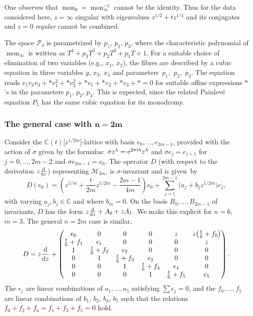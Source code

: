 \documentclass[10pt,a4paper]{amsart}
\numberwithin{equation}{section}
\begin{document}
 One observes that $\operatorname{mon}_0=\operatorname{mon}_\infty^{-1}$ cannot be the identity. Thus for the data considered here, $z=\infty$ singular with
 eigenvalues $z^{1/2}+tz^{1/4}$ and its conjugates and $z=0$ {\it regular} cannot be combined.



 The space $\mathcal{P}_4$ is parametrized by $p_1$, $p_2$, $p_3$, where the characteristic polynomial of $\operatorname{mon}_\infty$ is written as $T^4+p_3T^3+p_2T^2+p_1T+1$. For a suitable choice of
 elimination of two variables (e.g., $x_1$, $x_2$), the fibres are described by a cubic equation in three variables $y$, $x_3$, $x_4$ and parameters~$p_1$,~$p_2$,~$p_3$. The equation reads
 $v_1v_2v_3+*v_1^2+*v_2^2+*v_1+*v_2+*v_3+*=0$ for suitable affine expressions $*$'s in the parameters
 $p_1$, $p_2$, $p_3$. This is expected, since the related Painlev\'e equation $P_5$ has the same cubic equation for its monodromy.

 \subsubsection[The general case with n=2m]{The general case with $\boldsymbol{n=2m}$}

 Consider the $\mathbb{C}(t)\bigl[z^{1/2m}\bigr]$-lattice with basis $e_0,\dots ,e_{2m-1}$, provided with
 the action of $\sigma$ given by the formulas: $\sigma z^\lambda ={\rm e}^{2\pi {\rm i} \lambda}z^\lambda$ and
 $\sigma e_j=e_{j+1}$ for $j=0,\dots ,2m-2$ and $\sigma e_{2m-1}=e_0$. The operator $D$
 (with respect to the derivation $z\frac{{\rm d}}{{\rm d}z}$) representing $\mathcal{M}_{2m}$, is $\sigma$-invariant
 and is given~by
 \[D(e_0)=\left(z^{1/m}+\frac{t}{2m}z^{1/2m}-\frac{2m-1}{4m}\right)e_0 +\sum_{j=1}^{2m-1}\bigl(a_j+b_jz^{1/2m}\bigr)e_j,\]
with varying $a_j,b_j\in \mathbb{C}$ and where $b_m=0$.
 On the basis $B_0,\dots, B_{2m-1}$ of invariants, $D$ has the form $z\frac{{\rm d}}{{\rm d}z}+A_0+zA_1$.
 We make this explicit for $n=6$, $m=3$. The general $n=2m$ case is similar,
 \[ D=z\frac{{\rm d}}{{\rm d}z}+
\begin{pmatrix} \epsilon_0 &0 &0 &0 &z &z\bigl(\frac{t}{6}+f_0\bigr) \\
 \frac{t}{6}+f_1&\epsilon_1 &0 &0 &0 &z \\
 1&\frac{t}{6}+f_2 &\epsilon_2 &0 &0 &0 \\
 0& 1& \frac{t}{6}+f_3&\epsilon_3 &0 &0 \\
 0&0 &1 &\frac{t}{6}+f_4 &\epsilon_4 &0\\
 0&0 &0 & 1&\frac{t}{6}+f_5 & \epsilon _5\end{pmatrix}. \]
 The $\epsilon_j$ are linear combinations of $a_1,\dots ,a_5$ satisfying $\sum \epsilon_j=0$, and the
 $f_0,\dots ,f_5$ are linear combinations of $b_1$, $b_2$, $b_4$, $b_5$
 such that the relations $f_0+f_2+f_4=f_1+f_3+f_5=0$ hold.
\end{document}
